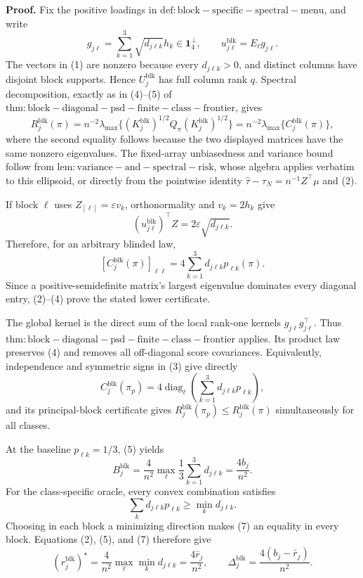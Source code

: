 \textbf{Proof.}
Fix the positive loadings in \(\mathrm{def:block-specific-spectral-menu}\), and write
\[
g_{j\ell}=\sum_{k=1}^3\sqrt{d_{j\ell k}}h_k\in\mathbf1_4^\perp,
\qquad u_{j\ell}^{\mathrm{blk}}=E_\ell g_{j\ell}. \tag{1}
\]
The vectors in (1) are nonzero because every \(d_{j\ell k}>0\), and distinct columns have disjoint block supports.  Hence \(U_j^{\mathrm{blk}}\) has full column rank \(q\).  Spectral decomposition, exactly as in (4)--(5) of \(\mathrm{thm:block-diagonal-psd-finite-class-frontier}\), gives
\[
R_j^{\mathrm{blk}}(\pi)
=n^{-2}\lambda_{\max}\{(K_j^{\mathrm{blk}})^{1/2}Q_\pi(K_j^{\mathrm{blk}})^{1/2}\}
=n^{-2}\lambda_{\max}\{C_j^{\mathrm{blk}}(\pi)\}, \tag{2}
\]
where the second equality follows because the two displayed matrices have the same nonzero eigenvalues.  The fixed-array unbiasedness and variance bound follow from \(\mathrm{lem:variance-and-spectral-risk}\), whose algebra applies verbatim to this ellipsoid, or directly from the pointwise identity \(\widehat\tau-\tau_N=n^{-1}Z^\top\mu\) and (2).

If block \(\ell\) uses \(Z_{[\ell]}=\varepsilon v_k\), orthonormality and \(v_k=2h_k\) give
\[
(u_{j\ell}^{\mathrm{blk}})^\top Z
=2\varepsilon\sqrt{d_{j\ell k}}. \tag{3}
\]
Therefore, for an arbitrary blinded law,
\[
[C_j^{\mathrm{blk}}(\pi)]_{\ell\ell}
=4\sum_{k=1}^3d_{j\ell k}p_{\ell k}(\pi). \tag{4}
\]
Since a positive-semidefinite matrix's largest eigenvalue dominates every diagonal entry, (2)--(4) prove the stated lower certificate.

The global kernel is the direct sum of the local rank-one kernels \(g_{j\ell}g_{j\ell}^\top\).  Thus \(\mathrm{thm:block-diagonal-psd-finite-class-frontier}\) applies.  Its product law preserves (4) and removes all off-diagonal score covariances.  Equivalently, independence and symmetric signs in (3) give directly
\[
C_j^{\mathrm{blk}}(\pi_p)
=4\operatorname{diag}_{\ell}
\left(\sum_{k=1}^3d_{j\ell k}p_{\ell k}\right), \tag{5}
\]
and its principal-block certificate gives \(R_j^{\mathrm{blk}}(\pi_p)\le R_j^{\mathrm{blk}}(\pi)\) simultaneously for all classes.

At the baseline \(p_{\ell k}=1/3\), (5) yields
\[
B_j^{\mathrm{blk}}
=\frac4{n^2}\max_\ell\frac13\sum_{k=1}^3d_{j\ell k}
=\frac{4b_j}{n^2}. \tag{6}
\]
For the class-specific oracle, every convex combination satisfies
\[
\sum_kd_{j\ell k}p_{\ell k}\ge\min_kd_{j\ell k}. \tag{7}
\]
Choosing in each block a minimizing direction makes (7) an equality in every block.  Equations (2), (5), and (7) therefore give
\[
(r_j^{\mathrm{blk}})^\star
=\frac4{n^2}\max_\ell\min_kd_{j\ell k}
=\frac{4\bar r_j}{n^2},
\qquad
\Delta_j^{\mathrm{blk}}=\frac{4(b_j-\bar r_j)}{n^2}. \tag{8}
\]

